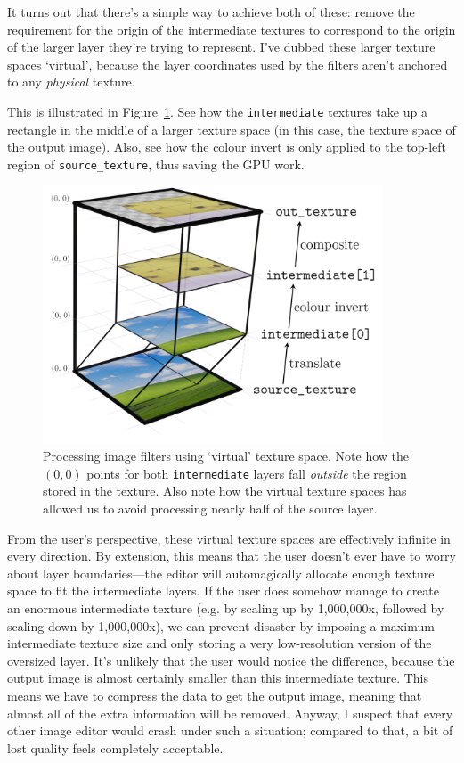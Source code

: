 \documentclass[12pt]{article}
\begin{document}
It turns out that there's a simple way to achieve both of these: remove the requirement for the
origin of the intermediate textures to correspond to the origin of the larger layer they're trying
to represent.  I've dubbed these larger texture spaces `virtual', because the layer coordinates used
by the filters aren't anchored to any \emph{physical} texture.

This is illustrated in Figure~\ref{fig:virt-tex-space}.  See how the \verb|intermediate| textures
take up a rectangle in the middle of a larger texture space (in this case, the texture space of the
output image).  Also, see how the colour invert is only applied to the top-left region of
\verb|source_texture|, thus saving the GPU work.

\begin{figure}
    \begin{center}
        \includegraphics[width=0.9\textwidth]{filter-stacking}
    \end{center}
    \caption{Processing image filters using `virtual' texture space.  Note how the $(0, 0)$ points
    for both \texttt{intermediate} layers fall \emph{outside} the region stored in the
    texture.  Also note how the virtual texture spaces has allowed us to avoid processing nearly
    half of the source layer.}\label{fig:virt-tex-space}
\end{figure}

From the user's perspective, these virtual texture spaces are effectively infinite in every
direction.  By extension, this means that the user doesn't ever have to worry about layer
boundaries---the editor will automagically allocate enough texture space to fit the intermediate
layers.  If the user does somehow manage to create an enormous intermediate texture (e.g. by
scaling up by 1,000,000x, followed by scaling down by 1,000,000x), we can prevent disaster by
imposing a maximum intermediate texture size and only storing a very low-resolution version of the
oversized layer.  It's unlikely that the user would notice the difference, because the output
image is almost certainly smaller than this intermediate texture.  This means we have to compress
the data to get the output image, meaning that almost all of the extra information will be removed.
Anyway, I suspect that every other image editor would crash under such a situation; compared to
that, a bit of lost quality feels completely acceptable.
\end{document}
